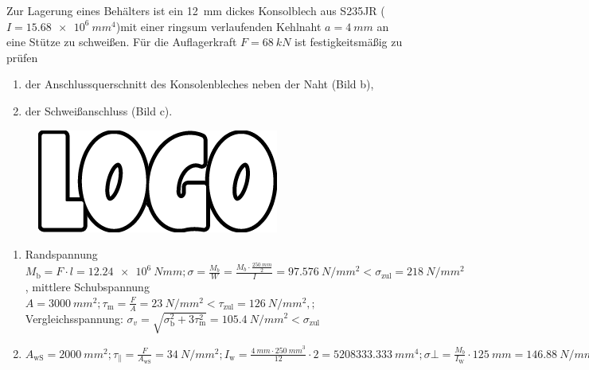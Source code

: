 \documentclass[11pt,a4paper]{scrartcl}
\begin{document}
\begin{question}
	Zur Lagerung eines Behälters ist ein \SI{12}{mm} dickes Konsolblech aus S235JR ($I=\SI{15.68e6}{mm^4}$)mit einer ringsum verlaufenden Kehlnaht $a=\SI{4}{mm}$ an eine Stütze zu schweißen. Für die Auflagerkraft $F=\SI{68}{kN}$ ist festigkeitsmäßig zu prüfen
	\begin{enumerate}
		\item der Anschlussquerschnitt des Konsolenbleches neben der Naht (Bild b),\item der Schweißanschluss (Bild c).
	\end{enumerate}
	\begin{figure}[H]
	\centering\includegraphics[width=.8\columnwidth]{logo}
\end{figure}
\end{question}
\begin{solution}[print]
	\begin{enumerate}
		\item Randspannung $ M_\text{b}=F\cdot l=\SI{12.24e6}{Nmm}; \sigma=\frac{M_b}{W}=\frac{M_b\cdot \frac{\SI{250}{mm}}{2}}{I}=\SI{97.576}{N\per mm^2}<\sigma_{\text{zul}}=\SI{218}{N\per mm^2}$, mittlere Schubspannung $A=\SI{3000}{mm^2}; \tau_\text{m}=\frac{F}{A}=\SI{23}{N\per mm^2}<\tau_{\text{zul}}=\SI{126}{N\per mm^2}, ;$ Vergleichsspannung: $\sigma_v=\sqrt{\sigma_\text{b}^2+3\tau_\text{m}^2}=\SI{105.4}{N\per mm^2}<\sigma_{\text{zul}}$ 
		\item $A_{\text{wS}}=\SI{2000}{mm^2}; \tau_{\parallel}=\frac{F}{A_{\text{wS}}}=\SI{34}{N\per mm^2}; I_{\text{w}}=\frac{\SI{4}{mm}\cdot\SI{250}{mm}^3}{12}\cdot 2=\SI{5208333.333}{mm^4}; \sigma{\bot}=\frac{M_b}{I_{\text{W}}}\cdot \SI{125}{mm}=\SI{146.88}{N\per mm^2}; \quad \sigma_{\text{wv}}=\SI{151}{N\per mm^2}<\sigma_{\text{w zul}}=\SI{207}{N\per mm^2} $ 
	\end{enumerate}
\end{solution}
\end{document}
